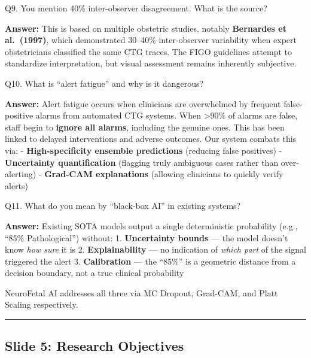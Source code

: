 \documentclass[11pt,a4paper]{article}
\begin{document}
\begin{questionbox}
Q9. You mention 40\% inter-observer disagreement. What is the
source?
\end{questionbox}
\textbf{Answer:} This is based on multiple obstetric studies, notably
\textbf{Bernardes et al.~(1997)}, which demonstrated 30--40\%
inter-observer variability when expert obstetricians classified the same
CTG traces. The FIGO guidelines attempt to standardize interpretation,
but visual assessment remains inherently subjective.

\begin{questionbox}
Q10. What is ``alert fatigue'' and why is it dangerous?
\end{questionbox}
\textbf{Answer:} Alert fatigue occurs when clinicians are overwhelmed by
frequent false-positive alarms from automated CTG systems. When
\textgreater90\% of alarms are false, staff begin to \textbf{ignore all
alarms}, including the genuine ones. This has been linked to delayed
interventions and adverse outcomes. Our system combats this via: -
\textbf{High-specificity ensemble predictions} (reducing false
positives) - \textbf{Uncertainty quantification} (flagging truly
ambiguous cases rather than over-alerting) - \textbf{Grad-CAM
explanations} (allowing clinicians to quickly verify alerts)

\begin{questionbox}
Q11. What do you mean by ``black-box AI'' in existing
systems?
\end{questionbox}
\textbf{Answer:} Existing SOTA models output a single deterministic
probability (e.g., ``85\% Pathological'') without: 1.
\textbf{Uncertainty bounds} --- the model doesn't know \emph{how sure}
it is 2. \textbf{Explainability} --- no indication of \emph{which part}
of the signal triggered the alert 3. \textbf{Calibration} --- the
``85\%'' is a geometric distance from a decision boundary, not a true
clinical probability

NeuroFetal AI addresses all three via MC Dropout, Grad-CAM, and Platt
Scaling respectively.

\begin{center}\rule{0.5\linewidth}{0.5pt}\end{center}

\subsection{Slide 5: Research
Objectives}\label{slide-5-research-objectives}
\end{document}
